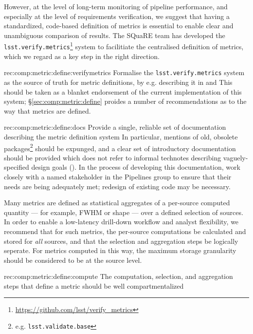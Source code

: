 However, at the level of long-term monitoring of pipeline performance, and especially at the level of requirements verification, we suggest that having a standardized, code-based definition of metrics is essential to enable clear and unambiguous comparison of results.
The SQuaRE team has developed the \texttt{lsst.verify.metrics}\footnote{\url{https://github.com/lsst/verify_metrics}} system to facilitiate the centralised definition of metrics, which we regard as a key step in the right direction.

\begin{recommendation}
    {rec:comp:metric:define:verifymetrics}
    {Formalise the \texttt{lsst.verify.metrics} system as the source of truth for metric definitions, by e.g. describing it in  and }
    This should be taken as a blanket endorsement of the current implementation of this system; \S\ref{sec:comp:metric:define} proides a number of recommendations as to the way that metrics are defined.
\end{recommendation}

\begin{recommendation}
    {rec:comp:metric:define:docs}
    {Provide a single, reliable set of documentation describing the metric definition system}
    In particular, mentions of old, obsolete packages\footnote{e.g. \texttt{lsst.validate.base}} should be expunged, and a clear set of introductory documentation should be provided which does not refer to informal technotes describing vaguely-specified design goals ().
    In the process of developing this documentation, work closely with a named stakeholder in the Pipelines group to ensure that their needs are being adequately met; redesign of existing code may be necessary.
\end{recommendation}

Many metrics are defined as statistical aggregates of a per-source computed quantity --- for example, FWHM or shape --- over a defined selection of sources.
In order to enable a low-latency drill-down workflow and analyst flexibility, we recommend that for such metrics, the per-source computations be calculated and stored for \emph{all} sources, and that the selection and aggregation steps be logically seperate.
For metrics computed in this way, the maximum storage granularity should be considered to be at the source level.

\begin{recommendation}
    {rec:comp:metric:define:compute}
    {The computation, selection, and aggregation steps that define a metric should be well compartmentalized}
\end{recommendation}

